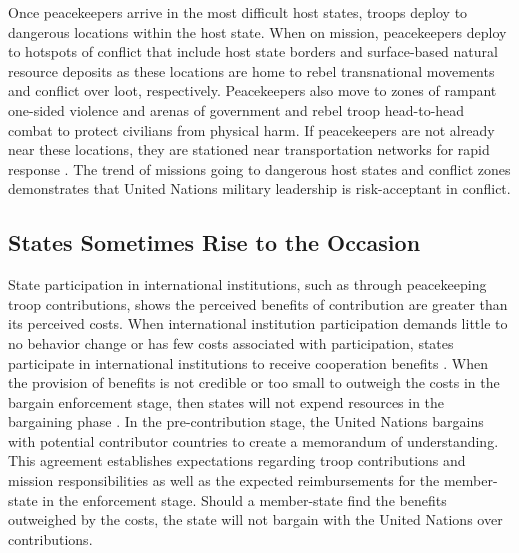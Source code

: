 \documentclass[12pt]{article}
\begin{document}

Once peacekeepers arrive in the most difficult host states, troops deploy to dangerous locations within the host state. When on mission, peacekeepers deploy to hotspots of conflict that include host state borders and surface-based natural resource deposits as these locations are home to rebel transnational movements and conflict over loot, respectively. Peacekeepers also move to zones of rampant one-sided violence \citep{fjelde2019} and arenas of government and rebel troop head-to-head combat \citep{phayal2020} to protect civilians from physical harm. If peacekeepers are not already near these locations, they are stationed near transportation networks for rapid response \citep{townsen2014}. The trend of missions going to dangerous host states and conflict zones demonstrates that United Nations military leadership is risk-acceptant in conflict. 

\subsection*{States Sometimes Rise to the Occasion}

State participation in international institutions, such as through peacekeeping troop contributions, shows the perceived benefits of contribution are greater than its perceived costs. When international institution participation demands little to no behavior change or has few costs associated with participation, states participate in international institutions to receive cooperation benefits \citep{downs1996}. When the provision of benefits is not credible or too small to outweigh the costs in the bargain enforcement stage, then states will not expend resources in the bargaining phase \citep{fearon1998}. In the pre-contribution stage, the United Nations bargains with potential contributor countries to create a memorandum of understanding. This agreement establishes expectations regarding troop contributions and mission responsibilities as well as the expected reimbursements for the member-state \citep{Deploy} in the enforcement stage. Should a member-state find the benefits outweighed by the costs, the state will not bargain with the United Nations over contributions. 
\end{document}
